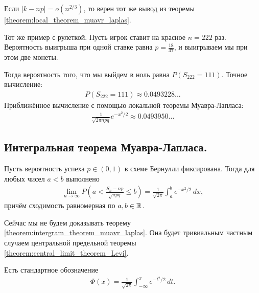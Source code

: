 \documentclass[../main.tex]{subfiles}
\begin{document}
\begin{remrk}
 Если $ \left| k-np \right| = o(n^{2 / 3}) $, то верен тот же вывод из теоремы \ref{theorem:local_theorem_muavr_laplas}.
\end{remrk}

\begin{exmpl}
 Тот же пример с рулеткой. Пусть игрок ставит на красное $n = 222$ раз. Вероятность выигрыша при одной ставке равна $p = \frac{18}{37}$, и выигрываем мы при этом две монеты.

 Тогда вероятность того, что мы выйдем в ноль равна $ P(S_{222} = 111) $. Точное вычисление:
 \begin{align*}
  P(S_{222} = 111) \approx 0.0493228...
 \end{align*} Приближённое вычисление с помощью локальной теоремы Муавра-Лапласа:
 \begin{align*}
  \frac{1}{\sqrt{2 \pi n p q}} e^{-x^2/2} \approx 0.0493950...
 \end{align*}
\end{exmpl}

\subsection{Интегральная теорема Муавра-Лапласа.}

\begin{thm}
 \label{theorem:intergram_theorem_muavr_laplas}
 Пусть вероятность успеха $ p \in (0,1)$  в схеме Бернулли фиксирована. Тогда для любых чисел $ a < b $ выполнено
 \begin{align}
  \label{eq:integral_theorem_muavr_lapplas}
  \lim_{n \to \infty} P\left(a < \frac{S_n - np}{\sqrt{npq}} \leqslant b\right) = \frac{1}{\sqrt{2\pi}} \int_{a}^{b} e^{-x^{2}/2}\,dx
 ,\end{align} причём сходимость равномерная по $a, b \in \mathbb{R}$.
\end{thm}

Сейчас мы не будем доказывать теорему \ref{theorem:intergram_theorem_muavr_laplas}. Она будет тривиальным частным случаем центральной предельной теоремы \ref{theorem:central_limit_theorem_Levi}.

\begin{notatn*}
 Есть стандартное обозначение
 \begin{align*}
  \Phi(x) = \frac{1}{\sqrt{2\pi}} \int_{-\infty}^{x} e^{-t^{2}/2}\,dt
 .\end{align*} 
\end{notatn*}
\end{document}
